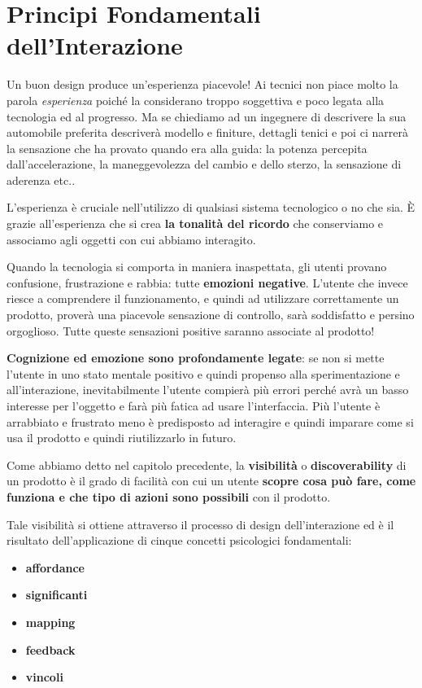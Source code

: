 \chapter{Principi Fondamentali dell'Interazione}

Un buon design produce un'esperienza piacevole! Ai tecnici non piace molto la parola \textit{esperienza} poiché la considerano troppo soggettiva e poco legata alla tecnologia ed al progresso. Ma se chiediamo ad un ingegnere di descrivere la sua automobile preferita descriverà modello e finiture, dettagli tenici e poi ci narrerà la sensazione che ha provato quando era alla guida: la potenza percepita dall'accelerazione, la maneggevolezza del cambio e dello sterzo, la sensazione di aderenza etc..

L'esperienza è cruciale nell'utilizzo di qualsiasi sistema tecnologico o no che sia. È grazie all'esperienza che si crea \textbf{la tonalità del ricordo} che conserviamo e associamo agli oggetti con cui abbiamo interagito.

Quando la tecnologia si comporta in maniera inaspettata, gli utenti provano confusione, frustrazione e rabbia: tutte \textbf{emozioni negative}. L'utente che invece riesce a comprendere il funzionamento, e quindi ad utilizzare correttamente un prodotto, proverà una piacevole sensazione di controllo, sarà soddisfatto e persino orgoglioso. Tutte queste sensazioni positive saranno associate al prodotto!

\textbf{Cognizione ed emozione sono profondamente legate}: se non si mette l'utente in uno stato mentale positivo e quindi propenso alla sperimentazione e all'interazione, inevitabilmente l'utente compierà più errori perché avrà un basso interesse per l'oggetto e farà più fatica ad usare l'interfaccia. Più l'utente è arrabbiato e frustrato meno è predisposto ad interagire e quindi imparare come si usa il prodotto e quindi riutilizzarlo in futuro.

Come abbiamo detto nel capitolo precedente, la \textbf{visibilità} o \textbf{discoverability} di un prodotto è il grado di facilità con cui un utente \textbf{scopre cosa può fare, come funziona e che tipo di azioni sono possibili} con il prodotto. 

Tale visibilità si ottiene attraverso il processo di design dell'interazione ed è il risultato dell'applicazione di cinque concetti psicologici fondamentali: 

\begin{itemize}
    \item \textbf{affordance}
    \item \textbf{significanti}
    \item \textbf{mapping} 
    \item \textbf{feedback}
    \item \textbf{vincoli}
\end{itemize}


